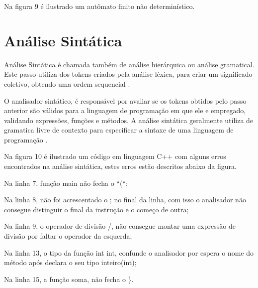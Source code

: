 \documentclass[12pt,oneside,a4paper,chapter=TITLE,section=TITLE,sumario=tradicional]{abntex2}
\begin{document}
Na figura 9 é ilustrado um autômato finito não determinístico.

\begin{figure}[H]
\end{figure}

\section{Análise Sintática}
\label{sec:analise-sintatica}

Análise Sintática é chamada também de análise hierárquica ou análise gramatical. Este passo utiliza dos tokens criados pela análise léxica, para criar um significado coletivo, obtendo uma ordem sequencial \cite{alfred1995}.

O analisador sintático, é responsável por avaliar se os tokens obtidos pelo passo anterior são válidos para a linguagem de programação em que ele e empregado, validando expressões, funções e métodos. A análise sintática geralmente utiliza de gramatica livre de contexto para especificar a sintaxe de uma linguagem de programação \cite{maragon2015}.

Na figura 10 é ilustrado um código em linguagem C++ com alguns erros encontrados na análise sintática, estes erros estão descritos abaixo da figura.

\begin{figure}[htb]
\end{figure}

\begin{lista}
	\item Na linha 7, função main não fecha o “(“;
	\item Na linha 8, não foi acrescentado o ; no final da linha, com isso o analisador não consegue distinguir o final da instrução e o começo de outra;
	\item Na linha 9, o operador de divisão /, não consegue montar uma expressão de divisão por faltar o operador da esquerda;
	\item Na linha 13, o tipo da função int int, confunde o analisador por espera o nome do método após declara o seu tipo inteiro(int);
	\item Na linha 15, a função soma, não fecha o \}.
\end{lista}
\end{document}

